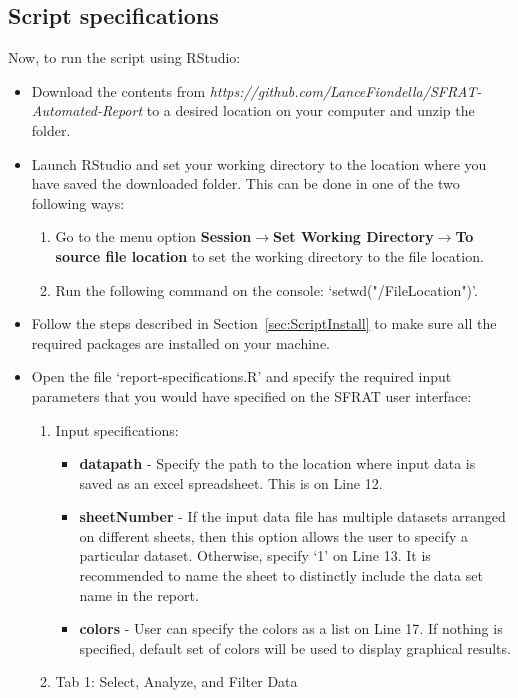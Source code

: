 \documentclass[conference]{IEEEtran}
\begin{document}
\subsection{Script specifications}\label{sec:ScriptRun}
Now, to run the script using RStudio:
\begin{itemize}
  \item {Download the contents from \textit{https://github.com/LanceFiondella/SFRAT-Automated-Report} to a desired location on your computer and unzip the folder.}
  \item {Launch RStudio and set your working directory to the location where you have saved the downloaded folder. This can be done in one of the two following ways:
  \begin{enumerate}
    \item {Go to the menu option \textbf{Session}$\to$\textbf{Set Working Directory}$\to$\textbf{To source file location} to set the working directory to the file location.}
    \item {Run the following command on the console: `setwd("/FileLocation")'.}
  \end{enumerate}
  }
  \item {Follow the steps described in Section~\ref{sec:ScriptInstall} to make sure all the required packages are installed on your machine.}
  \item {Open the file `report-specifications.R’ and specify the required input parameters that you would have specified on the SFRAT user interface:
  \begin{enumerate}
    \item {Input specifications:
    \begin{itemize}
      \item {\textbf{datapath} - Specify the path to the location where input data is saved as an excel spreadsheet. This is on Line 12.}
      \item {\textbf{sheetNumber} - If the input data file has multiple datasets arranged on different sheets, then this option allows the user to specify a particular dataset. Otherwise, specify `1' on Line 13. It is recommended to name the sheet to distinctly include the data set name in the report.}
      \item {\textbf{colors} - User can specify the colors as a list on Line 17. If nothing is specified, default set of colors will be used to display graphical results.}
    \end{itemize}
  }
    \item {Tab 1: Select, Analyze, and Filter Data
}
\end{enumerate}}
\end{itemize}
\end{document}
